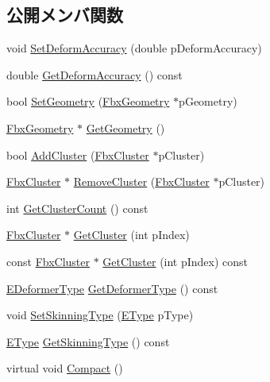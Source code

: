 \subsection*{公開メンバ関数}
\begin{DoxyCompactItemize}
\item 
void \hyperlink{class_fbx_skin_a3b74e10c3fb5a8d3a20feab6555fecdf}{Set\+Deform\+Accuracy} (double p\+Deform\+Accuracy)
\item 
double \hyperlink{class_fbx_skin_a1ac9a16df81616b1bee678cd3507e941}{Get\+Deform\+Accuracy} () const
\item 
bool \hyperlink{class_fbx_skin_a975c3ebb7a979bd28c7d9c9c236c09ee}{Set\+Geometry} (\hyperlink{class_fbx_geometry}{Fbx\+Geometry} $\ast$p\+Geometry)
\item 
\hyperlink{class_fbx_geometry}{Fbx\+Geometry} $\ast$ \hyperlink{class_fbx_skin_a982b88b989530a1ccb3cca6543c59f9c}{Get\+Geometry} ()
\item 
bool \hyperlink{class_fbx_skin_a6eb5b55faf155b9c63f33c1ebf418508}{Add\+Cluster} (\hyperlink{class_fbx_cluster}{Fbx\+Cluster} $\ast$p\+Cluster)
\item 
\hyperlink{class_fbx_cluster}{Fbx\+Cluster} $\ast$ \hyperlink{class_fbx_skin_a443fa63f322e84c08714eef77107f921}{Remove\+Cluster} (\hyperlink{class_fbx_cluster}{Fbx\+Cluster} $\ast$p\+Cluster)
\item 
int \hyperlink{class_fbx_skin_aa2f08718935873004ecfa0f7018830fb}{Get\+Cluster\+Count} () const
\item 
\hyperlink{class_fbx_cluster}{Fbx\+Cluster} $\ast$ \hyperlink{class_fbx_skin_a68f838f08f0760db6bcf8a64e478d2cf}{Get\+Cluster} (int p\+Index)
\item 
const \hyperlink{class_fbx_cluster}{Fbx\+Cluster} $\ast$ \hyperlink{class_fbx_skin_a12932e59ce0cf323f2a54d050aaa299e}{Get\+Cluster} (int p\+Index) const
\item 
\hyperlink{class_fbx_deformer_a07e2cfb767191ba5c8799fdfbfe3eaf6}{E\+Deformer\+Type} \hyperlink{class_fbx_skin_abaf5fca14c0e8339ea692560fbd494d8}{Get\+Deformer\+Type} () const
\item 
void \hyperlink{class_fbx_skin_afb0eae9feba38a19266fd0d20f84fd40}{Set\+Skinning\+Type} (\hyperlink{class_fbx_skin_aee398789ebed22fa97269a26c6049a16}{E\+Type} p\+Type)
\item 
\hyperlink{class_fbx_skin_aee398789ebed22fa97269a26c6049a16}{E\+Type} \hyperlink{class_fbx_skin_acd5153c9c43d4a4a659121c4142576ba}{Get\+Skinning\+Type} () const
\item 
virtual void \hyperlink{class_fbx_skin_a3c794b4a2f5e83725ea2f3b2b7b2d45c}{Compact} ()

\end{DoxyCompactItemize}
